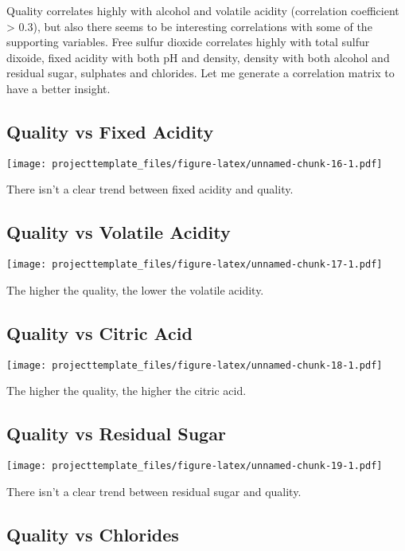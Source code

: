 \documentclass[]{article}
\begin{document}
Quality correlates highly with alcohol and volatile acidity (correlation
coefficient \textgreater{} 0.3), but also there seems to be interesting
correlations with some of the supporting variables. Free sulfur dioxide
correlates highly with total sulfur dixoide, fixed acidity with both pH
and density, density with both alcohol and residual sugar, sulphates and
chlorides. Let me generate a correlation matrix to have a better
insight.

\subsection{Quality vs Fixed Acidity}\label{quality-vs-fixed-acidity}

\texttt{[image: projecttemplate\_files/figure-latex/unnamed-chunk-16-1.pdf]}

There isn't a clear trend between fixed acidity and quality.

\subsection{Quality vs Volatile
Acidity}\label{quality-vs-volatile-acidity}

\texttt{[image: projecttemplate\_files/figure-latex/unnamed-chunk-17-1.pdf]}

The higher the quality, the lower the volatile acidity.

\subsection{Quality vs Citric Acid}\label{quality-vs-citric-acid}

\texttt{[image: projecttemplate\_files/figure-latex/unnamed-chunk-18-1.pdf]}

The higher the quality, the higher the citric acid.

\subsection{Quality vs Residual Sugar}\label{quality-vs-residual-sugar}

\texttt{[image: projecttemplate\_files/figure-latex/unnamed-chunk-19-1.pdf]}

There isn't a clear trend between residual sugar and quality.

\subsection{Quality vs Chlorides}\label{quality-vs-chlorides}
\end{document}

